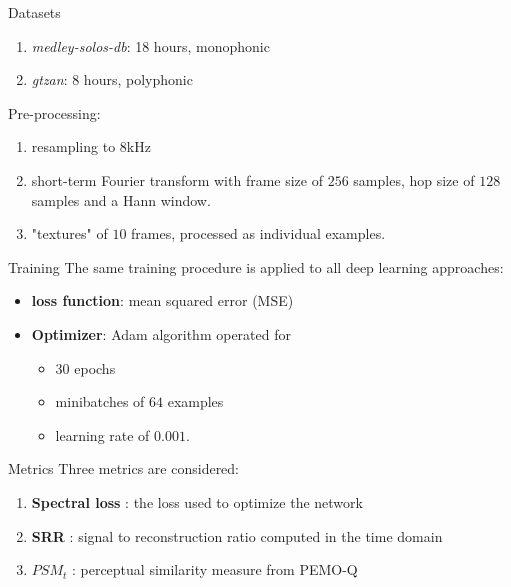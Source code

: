 \documentclass[compress]{beamer}
\begin{document}
\begin{frame}{Datasets}
\begin{enumerate}
  \item \textit{medley-solos-db}: 18 hours, monophonic
  \item \textit{gtzan}: 8 hours, polyphonic
\end{enumerate}
Pre-processing:

\begin{enumerate}
  \item resampling to $8$kHz
  \item short-term Fourier transform with frame size of $256$ samples, hop size of $128$ samples and a Hann window.
  \item "textures" of $10$ frames, processed as individual examples.
\end{enumerate}
\end{frame}

\begin{frame}{Training}
  The same training procedure is applied to all deep learning approaches:
  \begin{itemize}
    \item \textbf{loss function}: mean squared error (MSE)
    \item \textbf{Optimizer}: Adam algorithm operated for
    \begin{itemize}
      \item $30$ epochs
      \item minibatches of $64$ examples
      \item learning rate of $0.001$.
    \end{itemize}
  \end{itemize}
\end{frame}

\begin{frame}{Metrics}
Three metrics are considered:
\begin{enumerate}
  \item \textbf{Spectral loss} : the loss used to optimize the network
  \item \textbf{SRR} : signal to reconstruction ratio computed in the time domain
  \item \textbf{$PSM_t$} : perceptual similarity measure from PEMO-Q 
\end{enumerate}
\end{frame}
\end{document}
